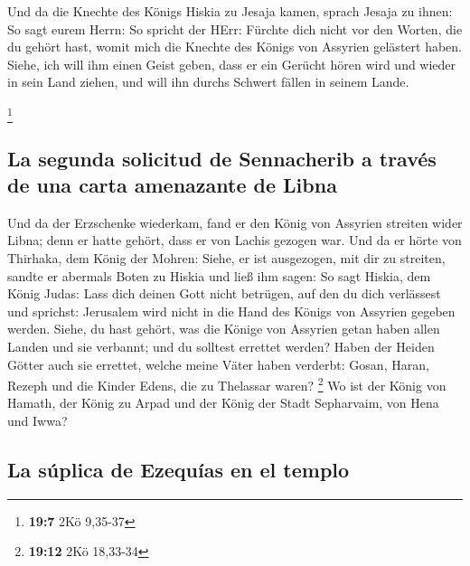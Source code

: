  Und da die Knechte des Königs Hiskia zu Jesaja kamen,
 sprach Jesaja zu ihnen: So sagt eurem Herrn: So spricht
der HErr: Fürchte dich nicht vor den Worten, die du gehört hast, womit
mich die Knechte des Königs von Assyrien gelästert haben. 
Siehe, ich will ihm einen Geist geben, dass er ein Gerücht hören wird
und wieder in sein Land ziehen, und will ihn durchs Schwert fällen in
seinem Lande.

\footnote{\textbf{19:7} 2Kö 9,35-37}

\hypertarget{la-segunda-solicitud-de-sennacherib-a-travuxe9s-de-una-carta-amenazante-de-libna}{%
\subsection{La segunda solicitud de Sennacherib a través de una carta
amenazante de
Libna}\label{la-segunda-solicitud-de-sennacherib-a-travuxe9s-de-una-carta-amenazante-de-libna}}

 Und da der Erzschenke wiederkam, fand er den König von
Assyrien streiten wider Libna; denn er hatte gehört, dass er von Lachis
gezogen war.  Und da er hörte von Thirhaka, dem König der
Mohren: Siehe, er ist ausgezogen, mit dir zu streiten, sandte er
abermals Boten zu Hiskia und ließ ihm sagen:  So sagt
Hiskia, dem König Judas: Lass dich deinen Gott nicht betrügen, auf den
du dich verlässest und sprichst: Jerusalem wird nicht in die Hand des
Königs von Assyrien gegeben werden.  Siehe, du hast
gehört, was die Könige von Assyrien getan haben allen Landen und sie
verbannt; und du solltest errettet werden?  Haben der
Heiden Götter auch sie errettet, welche meine Väter haben verderbt:
Gosan, Haran, Rezeph und die Kinder Edens, die zu Thelassar waren?
\footnote{\textbf{19:12} 2Kö 18,33-34}  Wo ist der König
von Hamath, der König zu Arpad und der König der Stadt Sepharvaim, von
Hena und Iwwa?

\hypertarget{la-suxfaplica-de-ezequuxedas-en-el-templo}{%
\subsection{La súplica de Ezequías en el
templo}\label{la-suxfaplica-de-ezequuxedas-en-el-templo}}

